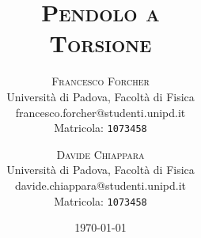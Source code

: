 \title {\vspace{-2cm} \fontsize{60pt}{10pt}\selectfont\textsc{Pendolo a \\[3mm] Torsione}}
\author{
\large
\textsc{Francesco Forcher}\\[2mm]
\normalsize Università di Padova, Facoltà di Fisica\\
\normalsize francesco.forcher@studenti.unipd.it\\
\normalsize Matricola: \texttt{1073458}\\
\and
\large
\textsc{Davide Chiappara}\\[2mm]
\normalsize Università di Padova, Facoltà di Fisica\\
\normalsize davide.chiappara@studenti.unipd.it\\
\normalsize Matricola: \texttt{1073458}\\
}
\date{\today}
